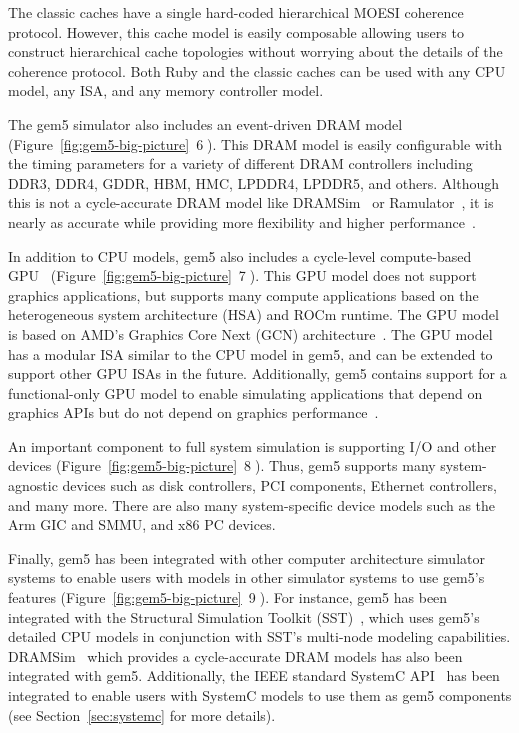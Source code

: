 The classic caches have a single hard-coded hierarchical MOESI coherence protocol.
However, this cache model is easily composable allowing users to construct hierarchical cache topologies without worrying about the details of the coherence protocol.
Both Ruby and the classic caches can be used with any CPU model, any ISA, and any memory controller model.

The gem5 simulator also includes an event-driven DRAM model (Figure~\ref{fig:gem5-big-picture}~\textcircled{6}).
This DRAM model is easily configurable with the timing parameters for a variety of different DRAM controllers including DDR3, DDR4, GDDR, HBM, HMC, LPDDR4, LPDDR5, and others.
Although this is not a cycle-accurate DRAM model like DRAMSim~\cite{wang_05, dramsim2, dramsim3} or Ramulator~\cite{yoongy_16}, it is nearly as accurate while providing more flexibility and higher performance~\cite{HanssonAgarwal2014-gem5DRAM}.

In addition to CPU models, gem5 also includes a cycle-level compute-based GPU~\cite{GutierrezBeckmann2018-amdAPU, Ta2019gputesting} (Figure~\ref{fig:gem5-big-picture}~\textcircled{7}).
This GPU model does not support graphics applications, but supports many compute applications based on the heterogeneous system architecture (HSA) and ROCm runtime.
The GPU model is based on AMD's Graphics Core Next (GCN) architecture~\cite{gcnWhitepaper, gcn3Manual}.
The GPU model has a modular ISA similar to the CPU model in gem5, and can be extended to support other GPU ISAs in the future. Additionally, gem5 contains support for a functional-only GPU model to enable simulating applications that depend on graphics APIs but do not depend on graphics performance~\cite{nomali}.

An important component to full system simulation is supporting I/O and other devices (Figure~\ref{fig:gem5-big-picture}~\textcircled{8}).
Thus, gem5 supports many system-agnostic devices such as disk controllers, PCI components, Ethernet controllers, and many more.
There are also many system-specific device models such as the Arm GIC and SMMU, and x86 PC devices.

Finally, gem5 has been integrated with other computer architecture simulator systems to enable users with models in other simulator systems to use gem5's features (Figure~\ref{fig:gem5-big-picture}~\textcircled{9}).
For instance, gem5 has been integrated with the Structural Simulation Toolkit (SST)~\cite{RodriguesHemmert2011-sst, HsiehPedretti2012-sst-gem5}, which uses gem5's detailed CPU models in conjunction with SST's multi-node modeling capabilities.
DRAMSim~\cite{wang_05, dramsim2, dramsim3} which provides a cycle-accurate DRAM models has also been integrated with gem5.
Additionally, the IEEE standard SystemC API~\cite{menard2017-system-systemc} has been integrated to enable users with SystemC models to use them as gem5 components (see Section~\ref{sec:systemc} for more details).
